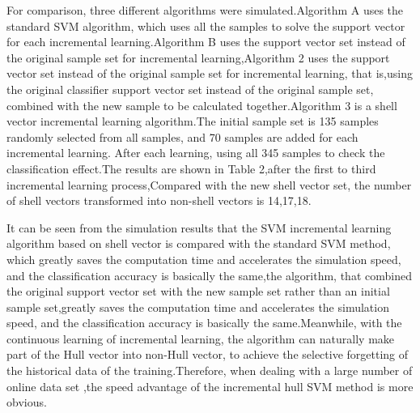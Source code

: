 \documentclass[a4paper]{article}
\begin{document}
For comparison, three different algorithms were simulated.Algorithm A uses the standard SVM algorithm, which uses all the samples to solve the support vector for each incremental learning.Algorithm B uses the support vector set instead of the original sample set for incremental learning,Algorithm 2 uses the support vector set instead of the original sample set for incremental learning, that is,using the original classifier support vector set instead of the original sample set, combined with the new sample to be calculated together.Algorithm 3 is a shell vector incremental learning algorithm.The initial sample set is 135 samples randomly selected from all samples, and 70 samples are added for each incremental learning. After each learning, using all 345 samples to check the classification effect.The results are shown in Table 2,after the first to third incremental learning process,Compared with the new shell vector set, the number of shell vectors transformed into non-shell vectors is 14,17,18.



It can be seen from the simulation results that the SVM incremental learning algorithm based on shell vector is compared with the standard SVM method, which greatly saves the computation time and accelerates the simulation speed, and the classification accuracy is basically the same,the algorithm, that combined the original support vector set with the new sample set rather than an initial sample set,greatly saves the computation time and accelerates the simulation speed, and the classification accuracy is basically the same.Meanwhile, with the continuous learning of incremental learning, the algorithm can naturally make part of the Hull vector into non-Hull vector, to achieve the selective forgetting of the historical data of the training.Therefore, when dealing with a large number of online data set ,the speed advantage of the incremental hull SVM method is more obvious.
\end{document}
